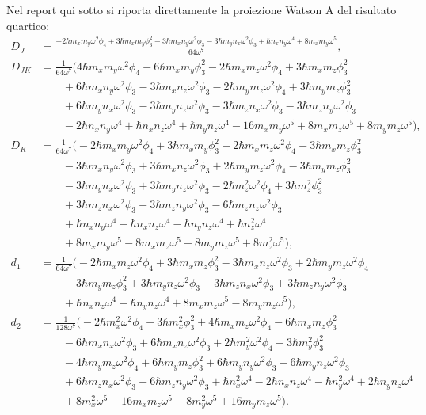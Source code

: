 \documentclass[11pt,a4paper]{article}
\begin{document}
Nel report qui sotto si riporta direttamente la proiezione Watson A del risultato quartico:
\begin{align}
D_J &= \frac{-2\hbar m_x m_y\omega^2\phi_4 + 3\hbar m_x m_y\phi_3^2 -3\hbar m_x n_y\omega^2\phi_3 -3\hbar m_y n_x\omega^2\phi_3 + \hbar n_x n_y\omega^4 + 8 m_x m_y\omega^5}{64\omega^7},\\
D_{JK} &= \frac{1}{64\omega^7}\Big(4\hbar m_x m_y\omega^2\phi_4 -6\hbar m_x m_y\phi_3^2 -2\hbar m_x m_z\omega^2\phi_4 +3\hbar m_x m_z\phi_3^2 \\
&\qquad +6\hbar m_x n_y\omega^2\phi_3 -3\hbar m_x n_z\omega^2\phi_3 -2\hbar m_y m_z\omega^2\phi_4 +3\hbar m_y m_z\phi_3^2 \\
&\qquad +6\hbar m_y n_x\omega^2\phi_3 -3\hbar m_y n_z\omega^2\phi_3 -3\hbar m_z n_x\omega^2\phi_3 -3\hbar m_z n_y\omega^2\phi_3 \\
&\qquad -2\hbar n_x n_y\omega^4 + \hbar n_x n_z\omega^4 + \hbar n_y n_z\omega^4 -16 m_x m_y\omega^5 +8 m_x m_z\omega^5 +8 m_y m_z\omega^5\Big),\\
D_K &= \frac{1}{64\omega^7}\Big(-2\hbar m_x m_y\omega^2\phi_4 +3\hbar m_x m_y\phi_3^2 +2\hbar m_x m_z\omega^2\phi_4 -3\hbar m_x m_z\phi_3^2 \\
&\qquad -3\hbar m_x n_y\omega^2\phi_3 +3\hbar m_x n_z\omega^2\phi_3 +2\hbar m_y m_z\omega^2\phi_4 -3\hbar m_y m_z\phi_3^2 \\
&\qquad -3\hbar m_y n_x\omega^2\phi_3 +3\hbar m_y n_z\omega^2\phi_3 -2\hbar m_z^2\omega^2\phi_4 +3\hbar m_z^2\phi_3^2 \\
&\qquad +3\hbar m_z n_x\omega^2\phi_3 +3\hbar m_z n_y\omega^2\phi_3 -6\hbar m_z n_z\omega^2\phi_3 \\
&\qquad +\hbar n_x n_y\omega^4 -\hbar n_x n_z\omega^4 -\hbar n_y n_z\omega^4 +\hbar n_z^2\omega^4 \\
&\qquad +8 m_x m_y\omega^5 -8 m_x m_z\omega^5 -8 m_y m_z\omega^5 +8 m_z^2\omega^5\Big),\\
d_1 &= \frac{1}{64\omega^7}\Big(-2\hbar m_x m_z\omega^2\phi_4 +3\hbar m_x m_z\phi_3^2 -3\hbar m_x n_z\omega^2\phi_3 +2\hbar m_y m_z\omega^2\phi_4 \\
&\qquad -3\hbar m_y m_z\phi_3^2 +3\hbar m_y n_z\omega^2\phi_3 -3\hbar m_z n_x\omega^2\phi_3 +3\hbar m_z n_y\omega^2\phi_3 \\
&\qquad +\hbar n_x n_z\omega^4 -\hbar n_y n_z\omega^4 +8 m_x m_z\omega^5 -8 m_y m_z\omega^5\Big),\\
d_2 &= \frac{1}{128\omega^7}\Big(-2\hbar m_x^2\omega^2\phi_4 +3\hbar m_x^2\phi_3^2 +4\hbar m_x m_z\omega^2\phi_4 -6\hbar m_x m_z\phi_3^2 \\
&\qquad -6\hbar m_x n_x\omega^2\phi_3 +6\hbar m_x n_z\omega^2\phi_3 +2\hbar m_y^2\omega^2\phi_4 -3\hbar m_y^2\phi_3^2 \\
&\qquad -4\hbar m_y m_z\omega^2\phi_4 +6\hbar m_y m_z\phi_3^2 +6\hbar m_y n_y\omega^2\phi_3 -6\hbar m_y n_z\omega^2\phi_3 \\
&\qquad +6\hbar m_z n_x\omega^2\phi_3 -6\hbar m_z n_y\omega^2\phi_3 +\hbar n_x^2\omega^4 -2\hbar n_x n_z\omega^4 -\hbar n_y^2\omega^4 +2\hbar n_y n_z\omega^4 \\
&\qquad +8 m_x^2\omega^5 -16 m_x m_z\omega^5 -8 m_y^2\omega^5 +16 m_y m_z\omega^5\Big).
\end{align}
\end{document}
